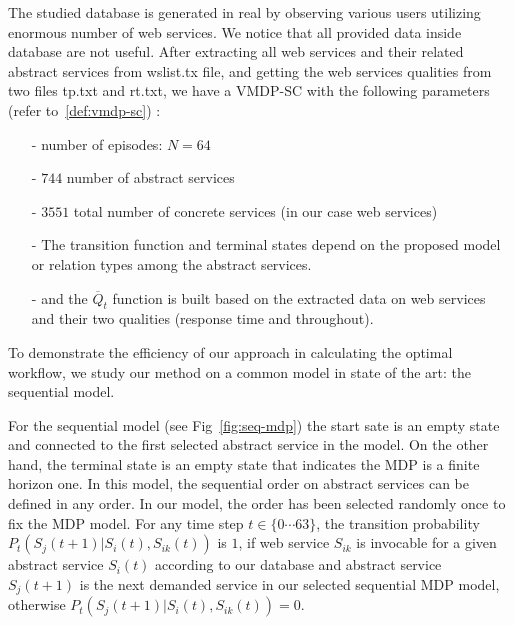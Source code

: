 \documentclass[10pt,journal,compsoc]{IEEEtran}
\begin{document}
The studied database\cite{Zheng2014,Zheng2015} is generated in real by observing various users utilizing enormous number of web services. We notice that all provided data inside database are not useful. After extracting all web services and their related abstract services from wslist.tx file, and getting the web services qualities from two files tp.txt and rt.txt, we have a VMDP-SC with the following parameters (refer to~\ref{def:vmdp-sc}) :
\begin{itemize}
\item[-] number of episodes:  $N=64$
\item[-] $744$ number of abstract services 
\item[-] $3551$ total number of concrete services (in our case web services)
\item[-] The transition function and terminal states depend on the proposed model or relation types among the abstract services. 
\item[-] and the $\overline{Q}_t$ function is built based on the extracted data on web services and their two qualities (response time and throughout).
\end{itemize}

To demonstrate the efficiency of our approach in calculating the optimal workflow, we study our method on a common model in state of the art: the sequential model. %

For the sequential model (see Fig~\ref{fig:seq-mdp}) the start sate is an empty state and connected to the first selected abstract service in the model. On the other hand, the terminal state is an empty state that indicates the MDP is a finite horizon one. In this model, the sequential order on abstract services can be defined in any order. In our model, the order has been selected randomly once to fix the MDP model. For any time step $t \in \{ 0 \cdots 63 \}$, the transition probability $P_t(S_j(t+1) | S_i(t), S_{ik}(t))$ is $1$, if web service $S_{ik}$ is invocable for a given abstract service $S_{i}(t)$ according to our database and abstract service $S_j(t+1)$ is the next demanded service in our selected sequential MDP model, otherwise $P_t(S_j(t+1)| S_i(t), S_{ik}(t)) = 0$. 

\end{document}
